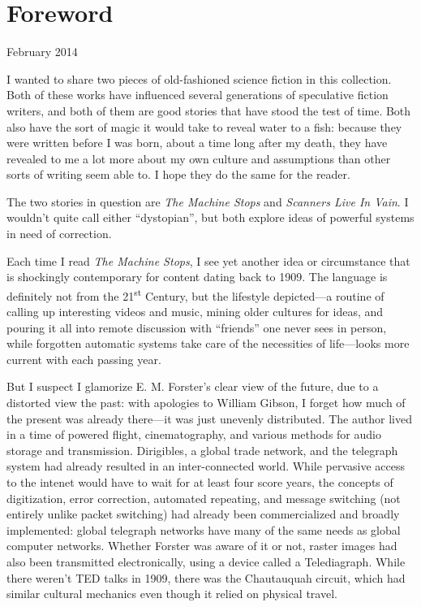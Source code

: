 \chapter{Foreword}

February 2014

I wanted to share two pieces of old-fashioned science fiction in this collection. Both of these works have influenced several generations of speculative fiction writers, and both of them are good stories that have stood the test of time. Both also have the sort of magic it would take to reveal water to a fish: because they were written before I was born, about a time long after my death, they have revealed to me a lot more about my own culture and assumptions than other sorts of writing seem able to. I hope they do the same for the reader.

The two stories in question are  \emph{The Machine Stops} and \emph{Scanners Live In Vain}. I wouldn't quite call either ``dystopian'', but both explore ideas of powerful systems in need of correction.

Each time I read \emph{The Machine Stops}, I see yet another idea or circumstance that is shockingly contemporary for content dating back to 1909. The language is definitely not from the 21\textsuperscript{st} Century, but the lifestyle depicted---a routine of calling up interesting videos and music, mining older cultures for ideas, and pouring it all into remote discussion with ``friends'' one never sees in person, while forgotten automatic systems take care of the necessities of life---looks more current with each passing year. 

But I suspect I glamorize E. M. Forster's clear view of the future, due to a distorted view the past: with apologies to William Gibson, I forget how much of the present was already there---it was just unevenly distributed. The author lived in a time of powered flight, cinematography, and various methods for audio storage and transmission. Dirigibles, a global trade network, and the telegraph system had already resulted in an in\-ter-con\-nect\-ed world. While pervasive access to the intenet would have to wait for at least four score years, the concepts of digitization, error correction, automated repeating, and message switching (not entirely unlike packet switching) had already been commercialized and broadly implemented: global telegraph networks have many of the same needs as global computer networks. Whether Forster was aware of it or not, raster images had also been transmitted electronically, using a device called a Telediagraph. While there weren't TED talks in 1909, there was the Chautauquah circuit, which had similar cultural mechanics even though it relied on physical travel.

